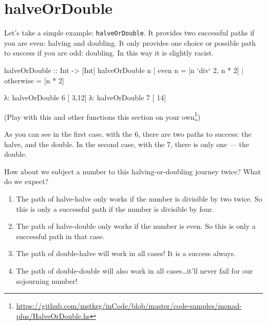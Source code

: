 \documentclass[]{article}
\newenvironment{Shaded}{}{}
\newcommand{\DataTypeTok}[1]{\textcolor[rgb]{0.56,0.13,0.00}{{#1}}}
\newcommand{\DecValTok}[1]{\textcolor[rgb]{0.25,0.63,0.44}{{#1}}}
\newcommand{\OtherTok}[1]{\textcolor[rgb]{0.00,0.44,0.13}{{#1}}}
\newcommand{\FunctionTok}[1]{\textcolor[rgb]{0.02,0.16,0.49}{{#1}}}
\newcommand{\NormalTok}[1]{{#1}}
\renewcommand{\href}[2]{#2\footnote{\url{#1}}}
\begin{document}
\section{halveOrDouble}\label{halveordouble}

Let's take a simple example: \texttt{halveOrDouble}. It provides two
successful paths if you are even: halving and doubling. It only provides
one choice or possible path to success if you are odd: doubling. In this
way it is slightly racist.

\begin{Shaded}
\begin{Highlighting}[]
\OtherTok{halveOrDouble ::} \DataTypeTok{Int} \OtherTok{->} \NormalTok{[}\DataTypeTok{Int}\NormalTok{]}
\NormalTok{halveOrDouble n }\FunctionTok{|} \NormalTok{even n    }\FunctionTok{=} \NormalTok{[n }\OtherTok{`div`} \DecValTok{2}\NormalTok{, n }\FunctionTok{*} \DecValTok{2}\NormalTok{]}
                \FunctionTok{|} \NormalTok{otherwise }\FunctionTok{=} \NormalTok{[n }\FunctionTok{*} \DecValTok{2}\NormalTok{]}
\end{Highlighting}
\end{Shaded}

\begin{Shaded}
\begin{Highlighting}[]
\NormalTok{λ}\FunctionTok{:} \NormalTok{halveOrDouble }\DecValTok{6}
\NormalTok{[ }\DecValTok{3}\NormalTok{,}\DecValTok{12}\NormalTok{]}
\NormalTok{λ}\FunctionTok{:} \NormalTok{halveOrDouble }\DecValTok{7}
\NormalTok{[   }\DecValTok{14}\NormalTok{]}
\end{Highlighting}
\end{Shaded}

(\href{https://github.com/mstksg/inCode/blob/master/code-samples/monad-plus/HalveOrDouble.hs}{Play
with this and other functions this section on your own})

As you can see in the first case, with the 6, there are two paths to
success: the halve, and the double. In the second case, with the 7,
there is only one --- the double.

How about we subject a number to this halving-or-doubling journey twice?
What do we expect?

\begin{enumerate}
\def\labelenumi{\arabic{enumi}.}
\tightlist
\item
  The path of halve-halve only works if the number is divisible by two
  twice. So this is only a successful path if the number is divisible by
  four.
\item
  The path of halve-double only works if the number is even. So this is
  only a successful path in that case.
\item
  The path of double-halve will work in all cases! It is a success
  always.
\item
  The path of double-double will also work in all cases\ldots{}it'll
  never fail for our sojourning number!
\end{enumerate}
\end{document}
